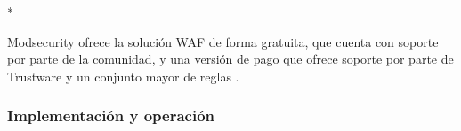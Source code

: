 \par \hypertarget{modlic}{*} Modsecurity ofrece la solución WAF de forma gratuita, que cuenta con soporte por parte de la
comunidad, y una versión de pago que ofrece soporte por parte de Trustware\cite{trustware} y un conjunto mayor de reglas
\cite{modsecuritysupport}.

\subsubsection{Implementación y operación}
\par \wip

\begin{comment}
\par Algunas soluciones se han descartado debido a que están discontinuadas desde hace tiempo: IronBee sin actualizar desde hace más de 3 años
y WebCastellum desde hace 5 años.
\par RAPTOR se ha descartado debido a que no soporta tráfico SSL/TLS y está en versión Beta.
\par NAXSI se ha considerado que no cumple los requisitos básicos que debe tener un WAF actualmente, pues sólo implementa dos controles de
seguridad - de los referenciados en el documento de buenas prácticas de OWASP\cite[apartado A3.2]{owaspbestpractices}); concretamente, sólo
protege ataques de tipo {\em Cross-site scripting} (en adelante \acrshort{xss}\cite{owaspxss}) e inyecciones SQL (en adelante
\acrshort{sqli}\cite{owaspsqli}). Además, se han producido duras críticas acerca de las funcionalidades que ofrece \cite{naxsianalisis}.
\par OpenWAF por su parte es una iniciativa con un planteamiento y unas funcionalidades muy interesantes, pero que lleva más de dos años sin
publicar una nueva versión y además carece de suficiente madurez para considerarse su uso en un entorno de producción (la última versión
publicada es la 0.0.4).
\par Respecto a FreeWAF (también conocido como {\em lua-resty-waf}) está en una situación muy similar a OpenWAF, pues su última versión tiene más de 2
años y se trata de la versión 0.11.1\cite{freewafchangelog}.
\par En el caso de Shadow Daemon, se trata de un conector de aplicación web con una funcionalidades interesantes, pero por diseño requiere de
su integración con el framework de desarrollo y sólo es compatible con PHP, Perl y Python. Por lo tanto no es posible implementarlo como
elemento externo e independiente de la plataforma web.
\par También se han descartado las siguientes soluciones debido a que no son compatibles con la plataforma GNU/Linux: WebKnight sólo es
compatible con el software de aplicación web Internet Information Services\cite{iis} y Vulture requiere un sistema operativo FreeBSD.



\end{comment}
